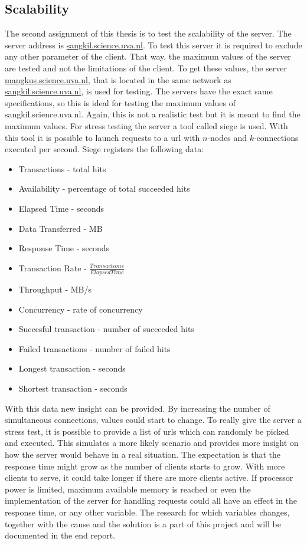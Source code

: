 \subsection{Scalability}
\label{sec:scalability}
The second assignment of this thesis is to test the scalability of the server. The server address is \url{sangkil.science.uva.nl}. To test this server it is required to exclude any other parameter of the client. That way, the maximum values of the server are tested and not the limitations of the client. To get these values, the server \url{mangkus.science.uva.nl}, that is located in the same network as \url{sangkil.science.uva.nl}, is used for testing. The servers have the exact same specifications, so this is ideal for testing the maximum values of sangkil.science.uva.nl. Again, this is not a realistic test but it is meant to find the maximum values.
For stress testing the server a tool called siege \cite{Siege} is used. With this tool it is possible to launch requests to a url with $n$-nodes and $k$-connections executed per second. Siege registers the following data:
\begin{itemize}
\item Transactions - total hits
\item Availability - percentage of total succeeded hits
\item Elapsed Time - seconds
\item Data Transferred - MB
\item Response Time - seconds
\item Transaction Rate - $\frac{Transactions}{Elapsed Time}$
\item Throughput - MB/s
\item Concurrency - rate of concurrency
\item Succesful transaction - number of succeeded hits
\item Failed transactions - number of failed hits
\item Longest transaction - seconds
\item Shortest transaction - seconds
\end{itemize}
With this data new insight can be provided. By increasing the number of simultaneous connections, values could start to change. To really give the server a stress test, it is possible to provide a list of urls which can randomly be picked and executed. This simulates a more likely scenario and provides more insight on how the server would behave in a real situation. The expectation is that the response time might grow as the number of clients starts to grow. With more clients to serve, it could take longer if there are more clients active. If processor power is limited, maximum available memory is reached or even the implementation of the server for handling requests could all have an effect in the response time, or any other variable. The research for which variables changes, together with the cause and the solution is a part of this project and will be documented in the end report. 


